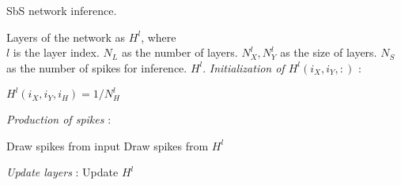 \appendix

\section{}
\label{sec:appendix_sbs_algorithm}


\begin{algorithm}[h!]
	\label{alg:inference}
	\caption{SbS network inference.}
	
	\begin{algorithmic}[1]
		\SetAlgoLined
		\renewcommand{\algorithmicrequire}{\textbf{input:}}
		\renewcommand{\algorithmicensure}{\textbf{output:}}
		\REQUIRE Layers of the network as $H^l$, where\\
		$l$ is the layer index.
		\REQUIRE $N_{L}$ as the number of layers.
		\REQUIRE $N^l_{X}, N^l_{Y}$ as the size of layers.
		\REQUIRE $N_{S}$ as the number of spikes for inference.
		\ENSURE $H^l$.
		\textit{Initialization of $H^l(i_X,i_Y,:)$} :
		
		\STATE $H^l(i_X,i_Y,i_{H}) = 1/N^l_H$
		\ENDFOR
		\ENDFOR
		\ENDFOR
		\ENDIF
		
		\textit{Production of spikes} :
		
		\STATE Draw spikes from input 
		\ELSE
		\STATE Draw spikes from $H^l$ 
		\ENDIF
		
		\ENDFOR
		
		\textit{Update layers} :
		\STATE Update $H^l$ 
		\ENDFOR
		
		\ENDFOR
	\end{algorithmic} 
\end{algorithm}



